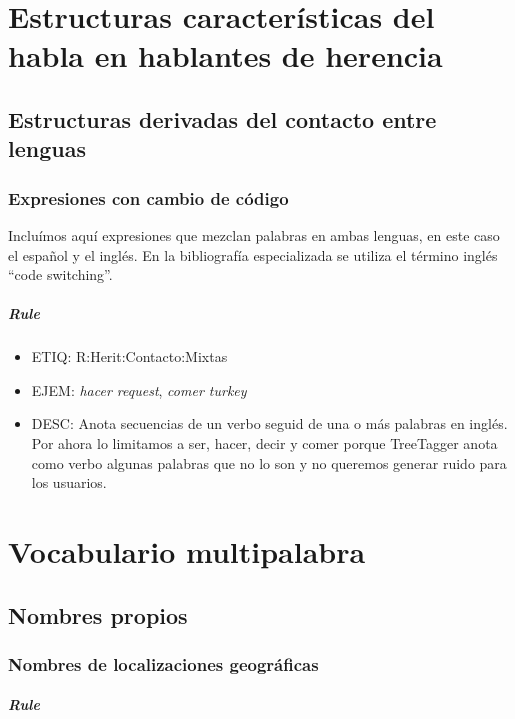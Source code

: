 \documentclass[11pt]{report}
\begin{document}
\chapter{Estructuras características del habla en hablantes de herencia}
\section{Estructuras derivadas del contacto entre lenguas}
\subsection{Expresiones con cambio de código}
Incluímos aquí expresiones que mezclan palabras en ambas lenguas, en este caso el español y el inglés. En la bibliografía especializada se utiliza el término inglés ``code switching''.

\paragraph*{Rule}
\begin{itemize}
\item ETIQ: R:Herit:Contacto:Mixtas
\item EJEM: \emph{hacer request}, \emph{comer turkey}
\item DESC: Anota secuencias de un verbo seguid de una o más palabras en inglés. Por ahora lo limitamos a ser, hacer, decir y comer porque TreeTagger anota como verbo algunas palabras que no lo son y no queremos generar ruido para los usuarios.
\end{itemize}

\chapter{Vocabulario multipalabra}
\section{Nombres propios}
\subsection{Nombres de localizaciones geográficas}
\paragraph*{Rule}
\end{document}
